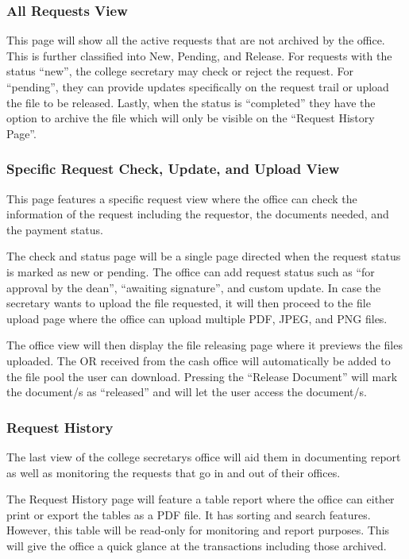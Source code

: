 \subsubsection{All Requests View}

This page will show all the active requests that are not archived by the office. This is further classified into New, Pending, and Release. For requests with the status “new”, the college secretary may check or reject the request. For “pending”, they can provide updates specifically on the request trail or upload the file to be released. Lastly, when the status is “completed”  they have the option to archive the file which will only be visible on the “Request History Page”.

\subsubsection{Specific Request Check, Update, and Upload View}

This page features a specific request view where the office can check the information of the request including the requestor, the documents needed, and the payment status.

The check and status page will be a single page directed when the request status is marked as new or pending. The office can add request status such as “for approval by the dean”, “awaiting signature”, and custom update. In case the secretary wants to upload the file requested, it will then proceed to the file upload page where the office can upload multiple PDF, JPEG, and PNG files.

The office view will then display the file releasing page where it previews the files uploaded. The OR received from the cash office will automatically be added to the file pool the user can download. Pressing the “Release Document” will mark the document/s as “released” and will let the user access the document/s.

\subsubsection{Request History}

The last view of the college secretary\textsc{}s office will aid them in documenting report as well as monitoring the requests that go in and out of their offices.

The Request History page will feature a table report where the office can either print or export the tables as a PDF file. It has sorting and search features. However, this table will be read-only for monitoring and report purposes. This will give the office a quick glance at the transactions including those archived.



